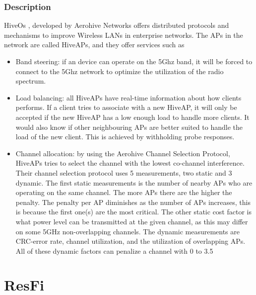 \subsubsection{Description}
HiveOs \cite{Aerohive}, developed by Aerohive Networks offers distributed protocols and mechanisms to improve Wireless LANs in enterprise networks. The APs 
in the network are called HiveAPs, and they offer services such as
\begin{itemize}
	\item Band steering: if an device can operate on the 5Ghz band, it will be forced to connect to the 5Ghz network to optimize the utilization of the radio spectrum. 
	\item Load balancing: all HiveAPs have real-time information about how clients performs. If a client tries to associate with a new HiveAP, it will only be accepted
				if the new HiveAP has a low enough load to handle more clients. It would also know if other neighbouring APs are better suited to handle the load of the new client.
				This is achieved by withholding probe responses.

	\item Channel allocation: by using the Aerohive Channel Selection Protocol, HiveAPs tries to select the channel with the lowest co-channel interference. Their channel selection protocol uses 5 measurements, two static and 3 dynamic.
	The first static measurements is the number of nearby APs who are operating on the same channel. The more APs there are the higher the penalty. The penalty per AP diminishes as the number of APs increases, this
		is because the first one(s) are the most critical. The other static cost factor is what power level can be transmitted at the given channel, as this may differ on some 5GHz non-overlapping channels. The dynamic measurements are CRC-error rate, channel utilization,
	and the utilization of overlapping APs. All of these dynamic factors can penalize a channel with 0 to 3.5%

\end{itemize}

\section{ResFi}
